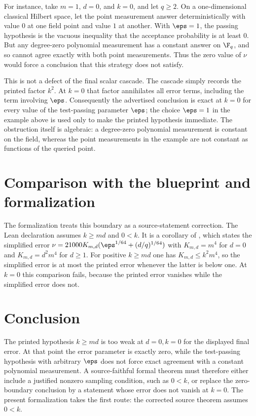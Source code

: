 \documentclass[11pt]{article}
\begin{document}
For instance, take \(m=1\), \(d=0\), and \(k=0\), and let \(q\ge 2\).  On a
one-dimensional classical Hilbert space, let the point measurement answer
deterministically with value \(0\) at one field point and value \(1\) at another.
With \(\eps=1\), the passing hypothesis is the vacuous inequality that the
acceptance probability is at least \(0\).  But any degree-zero polynomial
measurement has a constant answer on \(\F_q\), and so cannot agree exactly with
both point measurements.  Thus the zero value of \(\nu\) would force a
conclusion that this strategy does not satisfy.

This is not a defect of the final scalar cascade.  The cascade simply records
the printed factor \(k^2\).  At \(k=0\) that factor annihilates all error terms,
including the term involving \(\eps\).  Consequently the advertised conclusion
is exact at \(k=0\) for every value of the test-passing parameter \(\eps\); the
choice \(\eps=1\) in the example above is used only to make the printed
hypothesis immediate.  The obstruction itself is algebraic: a degree-zero
polynomial measurement is constant on the field, whereas the point measurements
in the example are not constant as functions of the queried point.

\section{Comparison with the blueprint and formalization}

The formalization treats this boundary as a source-statement correction.  The
Lean declaration  assumes
\(k\ge md\) and \(0<k\).  It is a corollary of
, which states the simplified error
\(\nu=21000K_{m,d}(\eps^{1/64}+(d/q)^{1/64})\) with \(K_{m,d}=m^4\) for
\(d=0\) and \(K_{m,d}=d^2m^4\) for \(d\ge1\).  For positive \(k\ge md\) one has
\(K_{m,d}\le k^2m^4\), so the simplified error is at most the printed error
whenever the latter is below one.  At \(k=0\) this comparison fails, because
the printed error vanishes while the simplified error does not.

\section{Conclusion}

The printed hypothesis \(k\ge md\) is too weak at \(d=0,k=0\) for the displayed
final error.  At that point the error parameter is exactly zero, while the
test-passing hypothesis with arbitrary \(\eps\) does not force exact agreement
with a constant polynomial measurement.  A source-faithful formal theorem must
therefore either include a justified nonzero sampling condition, such as
\(0<k\), or replace the zero-boundary conclusion by a statement whose error
does not vanish at \(k=0\).  The present formalization takes the first route:
the corrected source theorem assumes \(0<k\).



\end{document}
